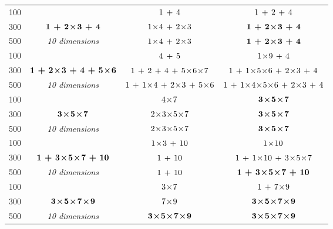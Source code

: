 \begin{table} [!ht]
\begin{center}
{\begin{tabular}{c   c |  c | c  }
												
100		&				&		 ${1} \, + \, {4}$ 		&		${1} \, + \, {2}  \, + \, {4}$ \\
300		&		$\bm{{1} \, + \, {2\! \times \! 3} \, + \, {4} }$ 		&		 ${1\! \times \! 4} \, + \, {2\! \times \! 3} $  		&		$\bm{{1} \, + \, {2\! \times \! 3} \, + \, {4}}$ \\
500		&		\emph{10 dimensions}		&		 ${1\! \times \! 4} \, + \, {2\! \times \! 3} $ 		&		$\bm{{1} \, + \, {2\! \times \! 3} \, + \, {4}}$ \\ \hline
												
												
100		&		 		&		 ${4} \, + \, {5}$ 		&		$ {1\! \times \! 9} \, + \, {4} $ \\
300		&		$\bm{{1} \, + \, {2\! \times \! 3}  \, + \, {4} \, + \, {5\! \times \! 6} } $ 		&		 ${1} \, + \, {2} \, + \, {4} \, + \, {5\! \times \! 6\! \times \! 7} $  		&		 ${1} \, + \, {1\! \times \!5\! \times \!6}  \, + \, {2\! \times \!3} \, + \, {4}$  \\
500		&		\emph{10 dimensions}		&		 ${1} \, + \, {1\! \times \! 4} \, + \, {2\! \times \! 3} \, + \, {5\! \times \! 6} $  		&		${1} \kernplus {1\kerntimes4\kerntimes5\kerntimes6} \kernplus {2\kerntimes3} \kernplus {4}$  \\ \hline
												
												
100		&				&		 ${{4\! \times \!7}} $ 		&		 $\bm{{3 \! \times \! 5 \! \times \! 7}}$ \\
300		&		$\bm{{3\! \times \!5\! \times \!7}} $ 		&		 ${{2 \! \times \!  3 \! \times \!5\! \times \!7}}$ 		&		$\bm{{3\! \times \!5\! \times \!7}}$ \\
500		&		\emph{10 dimensions}		&		 ${{2 \! \times \! 3\! \times \!5\! \times \!7}}$ 		&		$\bm{{3\! \times \!5\! \times \!7}}$ \\ \hline
												
												
100		&		 		&		 ${1\! \times \!3} \, + \, {10}$  		&		${1\! \times \!10} $ \\
300		&		$\bm{{1} \, + \, {3\! \times \!5\! \times \!7}  \, + \,  {10}} $ 		&		 ${1} \, + \, {10} $ 		&		${1} \, + \, {1\! \times \!10} \, + \, {3\! \times \!5\! \times \!7}$  \\
500		&		\emph{10 dimensions}		&		 ${1} \, + \, {10}$ 		&		$\bm{{1} \, + \, {3\! \times \!5\! \times \!7} \, + \, {10}}$  \\ \hline
												
												
100		&				&		 ${3 \! \times \! 7}$ 		&		${1} \, + \, {7\! \times \!9}$ \\
300		&		$\bm{{3\! \times \!5\! \times \!7\! \times \!9}} $ 		&		 ${7\! \times \!9}$ 		&		$\bm{{3\! \times \!5\! \times \!7\! \times \!9}}$ \\
500		&		\emph{10 dimensions}		&		 $\bm{{3\! \times \!5\! \times \!7\! \times \!9}}$ 		&		$\bm{{3\! \times \!5\! \times \!7\! \times \!9}}$ \\ \hline
												

\end{tabular}}
\end{center}
\end{table}
